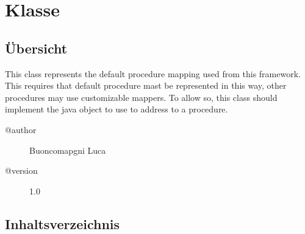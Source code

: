 
\section[Procedure]{Klasse }\label{ontologyFramework.OFDataMapping.ReservatedDataType.Procedure-class}
\subsection{Übersicht}
This class represents the default procedure mapping used 
 from this framework. This requires that default procedure mast
 be represented in this way, other procedures may use customizable mappers. 
 To allow so, this class should implement the java object to use to 
 address to a procedure.
\begin{description}
\item[@author] 
Buoncomapgni Luca
\item[@version] 
1.0
\end{description}
\subsection{Inhaltsverzeichnis}
